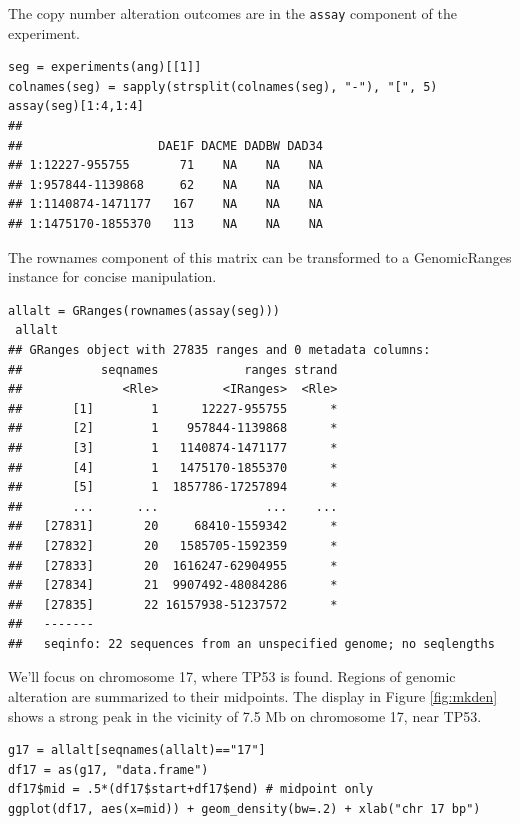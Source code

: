 \documentclass[graybox]{svmult}
\begin{document}
The copy number alteration outcomes are in the
\texttt{assay} component of the experiment.

\begin{shaded}
\begin{verbatim}
seg = experiments(ang)[[1]]
colnames(seg) = sapply(strsplit(colnames(seg), "-"), "[", 5)
assay(seg)[1:4,1:4]
##
##                   DAE1F DACME DADBW DAD34
## 1:12227-955755       71    NA    NA    NA
## 1:957844-1139868     62    NA    NA    NA
## 1:1140874-1471177   167    NA    NA    NA
## 1:1475170-1855370   113    NA    NA    NA
\end{verbatim}
\end{shaded}

The rownames component of this matrix can be transformed to
a GenomicRanges instance for concise manipulation.

\begin{shaded}
\begin{verbatim}
allalt = GRanges(rownames(assay(seg)))
 allalt
## GRanges object with 27835 ranges and 0 metadata columns:
##           seqnames            ranges strand
##              <Rle>         <IRanges>  <Rle>
##       [1]        1      12227-955755      *
##       [2]        1    957844-1139868      *
##       [3]        1   1140874-1471177      *
##       [4]        1   1475170-1855370      *
##       [5]        1  1857786-17257894      *
##       ...      ...               ...    ...
##   [27831]       20     68410-1559342      *
##   [27832]       20   1585705-1592359      *
##   [27833]       20  1616247-62904955      *
##   [27834]       21  9907492-48084286      *
##   [27835]       22 16157938-51237572      *
##   -------
##   seqinfo: 22 sequences from an unspecified genome; no seqlengths
\end{verbatim}
\end{shaded}


We'll focus on chromosome 17, where TP53 is found. Regions
of genomic alteration are summarized to their midpoints.
The display in Figure \ref{fig:mkden} shows a strong peak in the vicinity of 7.5 Mb on chromosome 17, near TP53.

\begin{shaded}
\begin{verbatim}
g17 = allalt[seqnames(allalt)=="17"]
df17 = as(g17, "data.frame")
df17$mid = .5*(df17$start+df17$end) # midpoint only
ggplot(df17, aes(x=mid)) + geom_density(bw=.2) + xlab("chr 17 bp")
\end{verbatim}
\end{shaded}
\end{document}
